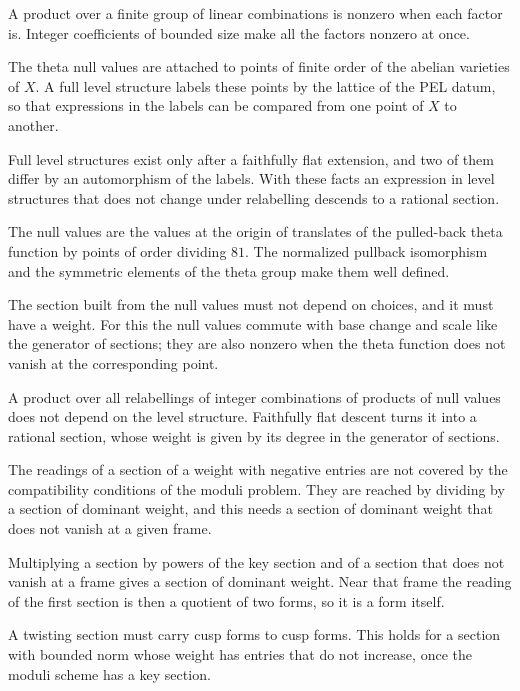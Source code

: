 A product over a finite group of linear combinations is nonzero when each factor is. Integer coefficients of
bounded size make all the factors nonzero at once.

The theta null values are attached to points of finite order of the abelian varieties of $X$. A full level
structure labels these points by the lattice of the PEL datum, so that expressions in the labels can be
compared from one point of $X$ to another.

Full level structures exist only after a faithfully flat extension, and two of them differ by an automorphism
of the labels. With these facts an expression in level structures that does not change under relabelling
descends to a rational section.

The null values are the values at the origin of translates of the pulled-back theta function by points of
order dividing $81$. The normalized pullback isomorphism and the symmetric elements of the theta group make
them well defined.

The section built from the null values must not depend on choices, and it must have a weight. For this the
null values commute with base change and scale like the generator of sections; they are also nonzero when the
theta function does not vanish at the corresponding point.

A product over all relabellings of integer combinations of products of null values does not depend on the
level structure. Faithfully flat descent turns it into a rational section, whose weight is given by its
degree in the generator of sections.

The readings of a section of a weight with negative entries are not covered by the compatibility conditions
of the moduli problem. They are reached by dividing by a section of dominant weight, and this needs a section
of dominant weight that does not vanish at a given frame.

Multiplying a section by powers of the key section and of a section that does not vanish at a frame gives a
section of dominant weight. Near that frame the reading of the first section is then a quotient of two
forms, so it is a form itself.

A twisting section must carry cusp forms to cusp forms. This holds for a section with bounded norm whose
weight has entries that do not increase, once the moduli scheme has a key section.


